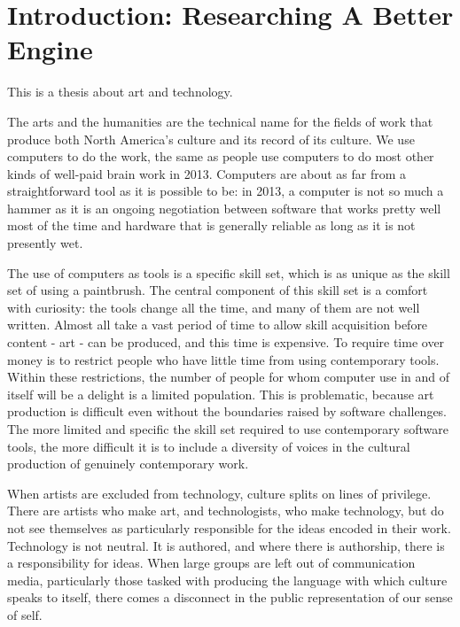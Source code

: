 
\chapter{Introduction: Researching A Better Engine} %

\label{Chapter1} %



This is a thesis about art and technology. 

The arts and the humanities are the technical name for the fields of work that produce both North America’s culture and its record of its culture. We use computers to do the work, the same as people use computers to do most other kinds of well-paid brain work in 2013. Computers are about as far from a straightforward tool as it is possible to be: in 2013, a computer is not so much a hammer as it is an ongoing negotiation between software that works pretty well most of the time and hardware that is generally reliable as long as it is not presently wet.

The use of computers as tools is a specific skill set, which is as unique as the skill set of using a paintbrush. The central component of this skill set is a comfort with curiosity: the tools change all the time, and many of them are not well written. Almost all take a vast period of time to allow skill acquisition before content - art - can be produced, and this time is expensive. To require time over money is to restrict people who have little time from using contemporary tools. Within these restrictions, the number of people for whom computer use in and of itself will be a delight is a limited population. This is problematic, because art production is difficult even without the boundaries raised by software challenges. The more limited and specific the skill set required to use contemporary software tools, the more difficult it is to include a diversity of voices in the cultural production of genuinely contemporary work. 

When artists are excluded from technology, culture splits on lines of privilege. There are artists who make art, and technologists, who make technology, but do not see themselves as particularly responsible for the ideas encoded in their work. Technology is not neutral. It is authored, and where there is authorship, there is a responsibility for ideas. When large groups are left out of communication media, particularly those tasked with producing the language with which culture speaks to itself, there comes a disconnect in the public representation of our sense of self. 

